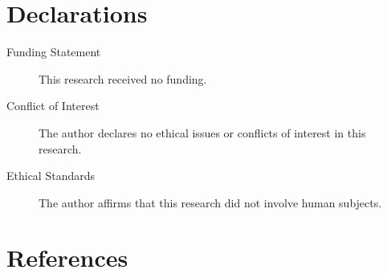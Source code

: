 \documentclass[
  12pt,
]{article}
\begin{document}
\section*{Declarations}

\begin{description}
\item[Funding Statement]
This research received no funding.
\item[Conflict of Interest]
The author declares no ethical issues or conflicts of interest in this research.
\item[Ethical Standards]
The author affirms that this research did not involve human subjects. 
\end{description}


\hypertarget{references}{%
\section*{References}\label{references}}
\end{document}
